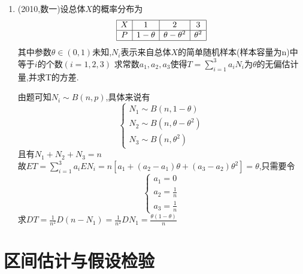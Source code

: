 \documentclass[12pt, a4paper, oneside, UTF8]{ctexbook}
\begin{document}
\begin{enumerate}[label=\arabic*.,start=4]
    \item (2010,数一)设总体$X$的概率分布为 
    \[
    \begin{array}{|c|c|c|c|}
        \hline
        X & 1 & 2 & 3 \\
        \hline
        P & 1-\theta & \theta - \theta^2 & \theta^2 \\
        \hline
    \end{array}
    \]
    其中参数$\theta\in(0,1)$未知,$N_i$表示来自总体$X$的简单随机样本(样本容量为n)中等于$i$的个数$(i=1,2,3)$
    求常数$a_1,a_2,a_3$使得$T=\sum_{i=1}^{3}a_iN_i$为$\theta$的无偏估计量,并求T的方差.
    \begin{solution}
        由题可知$N_i\sim B(n,p)$,具体来说有
        \[
        \begin{cases}
            N_1\sim B(n, 1-\theta) \\
            N_2\sim B(n, \theta-\theta^2)\\
            N_3\sim B(n, \theta^2)
        \end{cases}
        \]且有$N_1+N_2+N_3=n$ \\
        故$ET=\sum_{i=1}^{3}a_iEN_i=n\left[a_1+(a_2-a_1)\theta+(a_3-a_2)\theta^2\right]=\theta$,只需要令
        \[
        \begin{cases}
            a_1 = 0\\
            a_2 = \frac{1}{n} \\
            a_3 = \frac{1}{n}
        \end{cases}
        \]
        求$DT=\frac{1}{n^2}D(n-N_1)=\frac{1}{n^2}DN_1=\frac{\theta(1-\theta)}{n}$
    \end{solution}
\end{enumerate}
\section{区间估计与假设检验}
\ifx\allfiles\undefined
\end{document}

